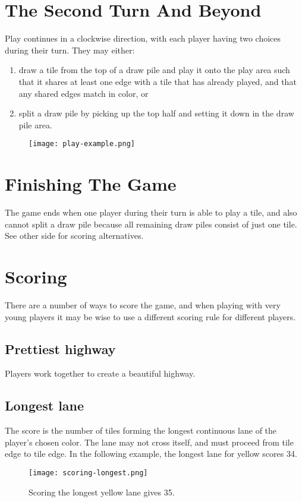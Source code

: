 \documentclass[twocolumn, 11pt]{article}
\begin{document}
\section*{The Second Turn And Beyond}
Play continues in a clockwise direction, with each player having two
choices during their turn.  They may either:
\begin{enumerate}
\item draw a tile from the top of a draw pile and play it onto the play area such that it shares at least one edge with a tile that has already played, and that any shared edges match in color,
or
\item split a draw pile by picking up the top half and setting it down
  in the draw pile area.
\end{enumerate}
\begin{figure}[th]
  \texttt{[image: play-example.png]}
\end{figure}

\section*{Finishing The Game}
The game ends when one player during their turn is able to play a
tile, and also cannot split a draw pile because all remaining draw
piles consist of just one tile.  See other side for scoring
alternatives.

\section*{Scoring}
There are a number of ways to score the game, and when playing with
very young players it may be wise to use a different scoring rule for
different players.
\subsection*{Prettiest highway}
Players work together to create a beautiful highway.
\subsection*{Longest lane}
The score is the number of tiles forming the longest continuous lane
of the player’s chosen color. The lane may not cross itself, and must
proceed from tile edge to tile edge.  In the following example, the
longest lane for yellow scores 34.

\begin{figure}[h]
  \texttt{[image: scoring-longest.png]}
  \caption{Scoring the longest yellow lane gives 35.}
\end{figure}
\end{document}
